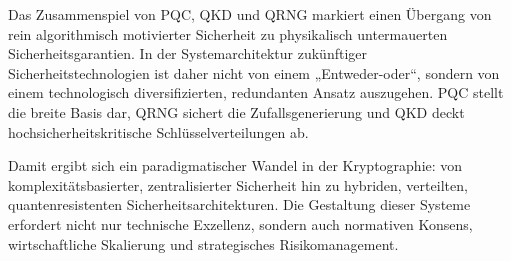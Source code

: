 
Das Zusammenspiel von PQC, QKD und QRNG markiert einen Übergang von rein algorithmisch motivierter Sicherheit zu physikalisch untermauerten Sicherheitsgarantien. In der Systemarchitektur zukünftiger Sicherheitstechnologien ist daher nicht von einem „Entweder-oder“, sondern von einem technologisch diversifizierten, redundanten Ansatz auszugehen. PQC stellt die breite Basis dar, QRNG sichert die Zufallsgenerierung und QKD deckt hochsicherheitskritische Schlüsselverteilungen ab.

Damit ergibt sich ein paradigmatischer Wandel in der Kryptographie: von komplexitätsbasierter, zentralisierter Sicherheit hin zu hybriden, verteilten, quantenresistenten Sicherheitsarchitekturen. Die Gestaltung dieser Systeme erfordert nicht nur technische Exzellenz, sondern auch normativen Konsens, wirtschaftliche Skalierung und strategisches Risikomanagement.

\printbibliography
